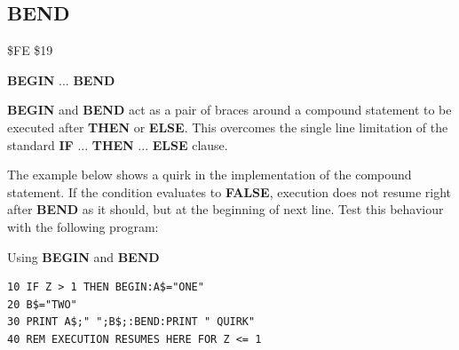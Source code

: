 \subsection{BEND}
\begin{description}[leftmargin=2cm,style=nextline]
\item [Token:] \$FE \$19
\item [Format:] {\bf BEGIN} ... {\bf BEND}
\item [Usage:] {\bf BEGIN} and {\bf BEND} act as
               a pair of braces around a compound statement
               to be executed after {\bf THEN} or {\bf ELSE}.
               This overcomes the single line limitation of the
               standard {\bf IF} ... {\bf THEN} ... {\bf ELSE} clause.
\item [Remarks:] The example below shows a quirk in the implementation
                 of the compound statement.
                 If the condition evaluates to {\bf FALSE}, execution
                 does not resume right after {\bf BEND} as it should,
                 but at the beginning of next line.
                 Test this behaviour with the following program:
\item [Example:] Using {\bf BEGIN} and {\bf BEND}
\begin{tcolorbox}[colback=black,coltext=white]
\verbatimfont{\codefont}
\begin{verbatim}
10 IF Z > 1 THEN BEGIN:A$="ONE"
20 B$="TWO"
30 PRINT A$;" ";B$;:BEND:PRINT " QUIRK"
40 REM EXECUTION RESUMES HERE FOR Z <= 1
\end{verbatim}
\end{tcolorbox}
\end{description}


\newpage
